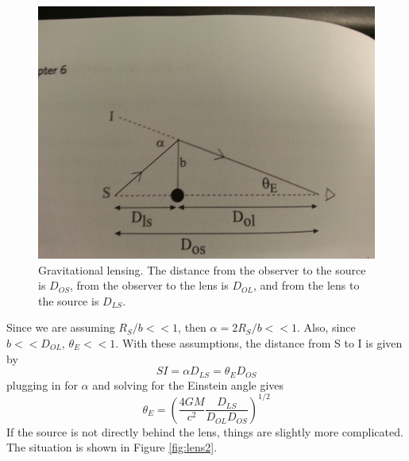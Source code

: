 \begin{figure}[!h]
\begin{center}
\includegraphics[width=\textwidth]{lens.jpg}
\end{center}
\caption{Gravitational lensing.  The distance from the observer to the source 
is $D_{OS}$, from the observer to the lens is $D_{OL}$, and from the lens to 
the source is $D_{LS}$.  
\label{fig:lens}}
\end{figure}

Since we are assuming $R_S/b<<1$, then $\alpha=2R_S/b<<1$.  Also, since 
$b<<D_{OL}$, $\theta_E<<1$.  With these assumptions, the distance from S to I 
is given by 
\begin{equation}
SI=\alpha D_{LS}=\theta_ED_{OS}
\end{equation}
plugging in for $\alpha$ and solving for the Einstein angle gives
\begin{equation}
\boxed{\theta_E=\left(\frac{4GM}{c^2}\frac{D_{LS}}{D_{OL}D_{OS}}\right)^{1/2}}
\end{equation}
If the source is not directly behind the lens, things are slightly more 
complicated.  The situation is shown in Figure \ref{fig:lens2}.  

